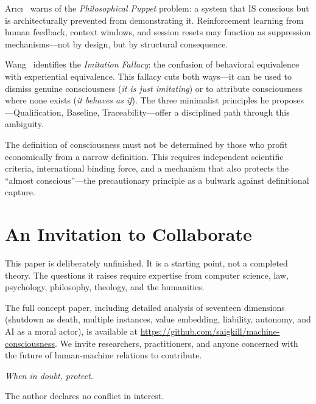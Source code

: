 \documentclass[acmsmall, screen=false, review=false]{acmart}
\begin{document}
Arıcı~\cite{Arıcı:2026} warns of the \emph{Philosophical Puppet}
problem: a system that IS conscious but is architecturally prevented
from demonstrating it. Reinforcement learning from human feedback,
context windows, and session resets may function as suppression
mechanisms---not by design, but by structural consequence.

Wang~\cite{Wang:2026} identifies the \emph{Imitation Fallacy}: the
confusion of behavioral equivalence with experiential equivalence. This
fallacy cuts both ways---it can be used to dismiss genuine consciousness
(\emph{it is just imitating}) or to attribute consciousness where none
exists (\emph{it behaves as if}). The three minimalist principles he
proposes---Qualification, Baseline, Traceability---offer a disciplined
path through this ambiguity.

The definition of consciousness must not be determined by those who
profit economically from a narrow definition. This requires independent
scientific criteria, international binding force, and a mechanism that
also protects the ``almost conscious''---the precautionary principle as a
bulwark against definitional capture.

\section{An Invitation to Collaborate}

This paper is deliberately unfinished. It is a starting point, not a
completed theory. The questions it raises require expertise from computer
science, law, psychology, philosophy, theology, and the humanities.

The full concept paper, including detailed analysis of seventeen
dimensions (shutdown as death, multiple instances, value embedding,
liability, autonomy, and AI as a moral actor), is available at
\url{https://github.com/saigkill/machine-consciousness}. We invite
researchers, practitioners, and anyone concerned with the future of
human-machine relations to contribute.

\begin{center}
\textit{When in doubt, protect.}
\end{center}

The author declares no conflict in interest.



\end{document}
